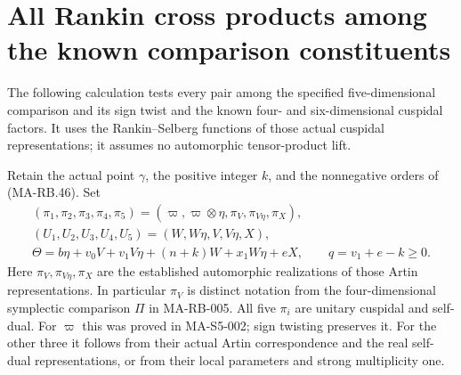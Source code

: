 \section{All Rankin cross products among the known comparison constituents}
\label{sec:s5-rankin-cross}

The following calculation tests every pair among the specified
five-dimensional comparison and its sign twist and the known
four- and six-dimensional cuspidal factors. It uses the
Rankin--Selberg functions of those actual cuspidal representations;
it assumes no automorphic tensor-product lift.

Retain the actual point \(\gamma\), the positive integer \(k\),
and the nonnegative orders of (MA-RB.46). Set
\[
 \begin{gathered}
 (\pi_1,\pi_2,\pi_3,\pi_4,\pi_5)
   =(\varpi,\varpi\otimes\eta,\pi_V,\pi_{V\eta},\pi_X),\\
 (U_1,U_2,U_3,U_4,U_5)=(W,W\eta,V,V\eta,X),\\
 \Theta=b\eta+v_0V+v_1V\eta+(n+k)W+x_1W\eta+eX,\qquad
 q=v_1+e-k\ge0.
 \end{gathered}
 \tag{MA-RB.61}
\]
Here \(\pi_V,\pi_{V\eta},\pi_X\) are the established
automorphic realizations of those Artin representations.
In particular \(\pi_V\) is distinct notation from the
four-dimensional symplectic comparison \(\Pi\) in MA-RB-005.
All five \(\pi_i\) are unitary cuspidal and self-dual.
For \(\varpi\) this was proved in MA-S5-002; sign twisting
preserves it. For the other three it follows from their
actual Artin correspondence and the real self-dual
representations, or from their local parameters and strong
multiplicity one.

